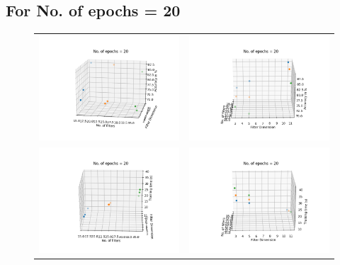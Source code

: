 \documentclass{article} %
\begin{document}
\subsection{For No. of epochs = 20}
\begin{figure}[H]
\centering
\begin{tabular}{cc}
\includegraphics[width=0.5\linewidth]{images/e20a1.png}
&
\includegraphics[width=0.5\linewidth]{images/e20a2.png}
\\
\includegraphics[width=0.5\linewidth]{images/e20t1.png}
&
\includegraphics[width=0.5\linewidth]{images/e20t2.png}
\end{tabular}
\end{figure}
\end{document}
